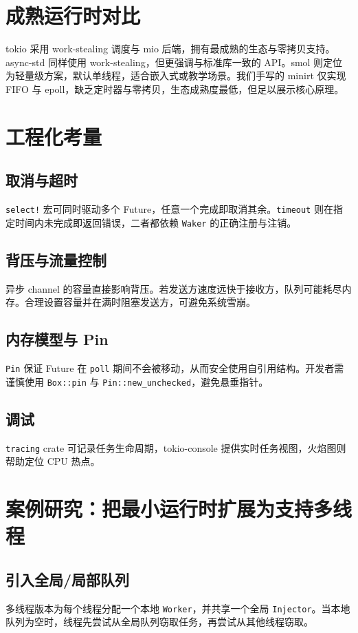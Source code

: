 \chapter{成熟运行时对比}
tokio 采用 work-stealing 调度与 mio 后端，拥有最成熟的生态与零拷贝支持。async-std 同样使用 work-stealing，但更强调与标准库一致的 API。smol 则定位为轻量级方案，默认单线程，适合嵌入式或教学场景。我们手写的 minirt 仅实现 FIFO 与 epoll，缺乏定时器与零拷贝，生态成熟度最低，但足以展示核心原理。\par
\chapter{工程化考量}
\section{取消与超时}
\texttt{select!} 宏可同时驱动多个 Future，任意一个完成即取消其余。\texttt{timeout} 则在指定时间内未完成即返回错误，二者都依赖 \texttt{Waker} 的正确注册与注销。\par
\section{背压与流量控制}
异步 channel 的容量直接影响背压。若发送方速度远快于接收方，队列可能耗尽内存。合理设置容量并在满时阻塞发送方，可避免系统雪崩。\par
\section{内存模型与 Pin}
\texttt{Pin} 保证 Future 在 \texttt{poll} 期间不会被移动，从而安全使用自引用结构。开发者需谨慎使用 \texttt{Box::pin} 与 \texttt{Pin::new\_{}unchecked}，避免悬垂指针。\par
\section{调试}
\texttt{tracing} crate 可记录任务生命周期，tokio-console 提供实时任务视图，火焰图则帮助定位 CPU 热点。\par
\chapter{案例研究：把最小运行时扩展为支持多线程}
\section{引入全局/局部队列}
多线程版本为每个线程分配一个本地 \texttt{Worker}，并共享一个全局 \texttt{Injector}。当本地队列为空时，线程先尝试从全局队列窃取任务，再尝试从其他线程窃取。\par
